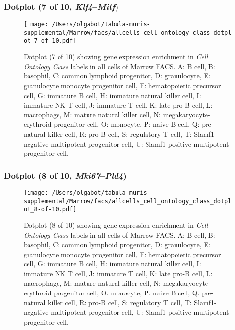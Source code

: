\subsubsection{Dotplot (7 of 10, \emph{Klf4}--\emph{Mitf})}
\begin{figure}[h]
\centering
\texttt{[image: /Users/olgabot/tabula-muris-supplemental/Marrow/facs/allcells\_cell\_ontology\_class\_dotplot\_7-of-10.pdf]}

\caption{ Dotplot (7 of 10)  showing gene expression enrichment in \emph{Cell Ontology Class} labels in all cells of Marrow FACS. A: B cell, B: basophil, C: common lymphoid progenitor, D: granulocyte, E: granulocyte monocyte progenitor cell, F: hematopoietic precursor cell, G: immature B cell, H: immature natural killer cell, I: immature NK T cell, J: immature T cell, K: late pro-B cell, L: macrophage, M: mature natural killer cell, N: megakaryocyte-erythroid progenitor cell, O: monocyte, P: naive B cell, Q: pre-natural killer cell, R: pro-B cell, S: regulatory T cell, T: Slamf1-negative multipotent progenitor cell, U: Slamf1-positive multipotent progenitor cell.}
\end{figure}


\clearpage

\subsubsection{Dotplot (8 of 10, \emph{Mki67}--\emph{Pld4})}
\begin{figure}[h]
\centering
\texttt{[image: /Users/olgabot/tabula-muris-supplemental/Marrow/facs/allcells\_cell\_ontology\_class\_dotplot\_8-of-10.pdf]}

\caption{ Dotplot (8 of 10)  showing gene expression enrichment in \emph{Cell Ontology Class} labels in all cells of Marrow FACS. A: B cell, B: basophil, C: common lymphoid progenitor, D: granulocyte, E: granulocyte monocyte progenitor cell, F: hematopoietic precursor cell, G: immature B cell, H: immature natural killer cell, I: immature NK T cell, J: immature T cell, K: late pro-B cell, L: macrophage, M: mature natural killer cell, N: megakaryocyte-erythroid progenitor cell, O: monocyte, P: naive B cell, Q: pre-natural killer cell, R: pro-B cell, S: regulatory T cell, T: Slamf1-negative multipotent progenitor cell, U: Slamf1-positive multipotent progenitor cell.}
\end{figure}


\clearpage

